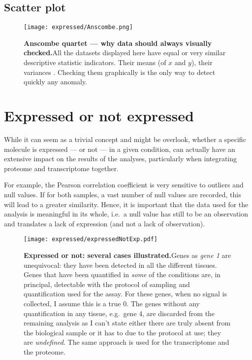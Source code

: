\subsection{Scatter plot}



\begin{figure}[!htbp]
    \texttt{[image: expressed/Anscombe.png]}\centering
      \caption[Anscombe quartet --- why data should always visualy checked]
      {\label{fig:Anscombe}\textbf{Anscombe quartet --- why data should always
      visually checked.}\smallbreak{}All the datasets displayed here have equal
      or very similar descriptive statistic indicators. Their means (of $x$ and
      $y$), their variances 
        . Checking them graphically is the only way to detect quickly
      any anomaly.}
\end{figure}


\section{Expressed or not expressed}
\label{sec:ExpressedOrNot}
While it can seem as a trivial concept and might be overlook, whether a specific
molecule is expressed --- or not --- in a given condition, can actually have
an extensive impact on the results of the analyses, particularly when integrating
proteome and transcriptome together.

For example, the Pearson correlation coefficient is very
sensitive to outliers and null values. If for both samples, a vast number of
null values are recorded, this will lead to a greater similarity.
Hence, it is important that the data used for the analysis is meaningful in
its whole, i.e.\ a null value has still to be an observation and translates
a lack of expression (and not a lack of observation).

\begin{figure}[!htbp]
    \texttt{[image: expressed/expressedNotExp.pdf]}\centering
      \caption[Expressed or not: several cases illustrated]
      {\label{fig:DefineExpression}\textbf{Expressed or not: several cases
      illustrated.}\smallbreak{}Genes as \emph{gene 1} are unequivocal: they have been
      detected in all the different tissues. Genes that have been quantified in
      \emph{some} of the conditions are, in principal, detectable with the
      protocol of sampling and quantification used for the assay.
      For these genes, when no signal is collected, I assume this is a true $0$.
      The genes without any quantification
      in any tissue, e.g.\ gene 4, are discarded from the remaining analysis as
      I can't state
      either there are truly absent from the biological sample or it has to due
      to the protocol at use; they are \emph{undefined}. The same approach is used
      for the transcriptome and the proteome.}
\end{figure}

